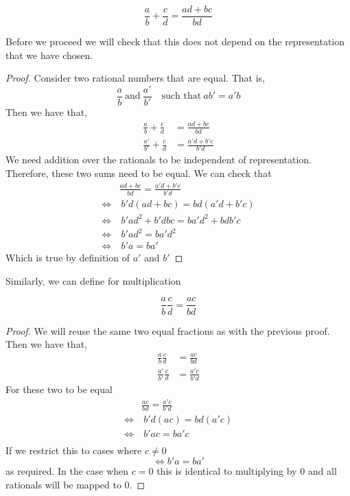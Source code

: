 \documentclass{article}
\begin{document}
\begin{defi}
    \[
        \frac{a}{b} + \frac{c}{d} = \frac{ad + bc}{bd}
    \]
\end{defi}

Before we proceed we will check that this does not depend on the representation that we have chosen.
\begin{proof}
    Consider two rational numbers that are equal. That is, 
    \[
        \frac{a}{b} \ \text{and} \ \frac{a'}{b'} \quad \text{such that} \ ab' = a'b
    \]
    Then we have that, 
    \begin{align*}
        \frac{a}{b} + \frac{c}{d} &= \frac{ad + bc}{bd} \\
        \frac{a'}{b'} + \frac{c}{d} &= \frac{a'd + b'c}{b'd}
    \end{align*}
    We need addition over the rationals to be independent of representation. Therefore, these two sums need to be equal. We can check that
    \begin{align*}
        &\frac{ad + bc}{bd} = \frac{a'd + b'c}{b'd} \\
        \Leftrightarrow& \ b'd(ad + bc) = bd(a'd + b'c) \\
        \Leftrightarrow& \ b'ad^2 + b'dbc = ba'd^2 + bdb'c \\
        \Leftrightarrow& \ b'ad^2 = ba'd^2 \\
        \Leftrightarrow& \ b'a = ba' \tag{since $d \neq 0$}
    \end{align*}
    Which is true by definition of $a'$ and $b'$
\end{proof}

Similarly, we can define for multiplication
\begin{defi}
    \[
        \frac{a}{b}\frac{c}{d} = \frac{ac}{bd}
    \]
\end{defi}
\begin{proof}
    We will reuse the same two equal fractions as with the previous proof. Then we have that, 
    \begin{align*}
        \frac{a}{b}\frac{c}{d} &= \frac{ac}{bd} \\
        \frac{a'}{b'}\frac{c}{d} &= \frac{a'c}{b'd}
    \end{align*}
    For these two to be equal
    \begin{align*}
        &\frac{ac}{bd} = \frac{a'c}{b'd} \\
        \Leftrightarrow& \ b'd(ac) = bd(a'c) \\
        \Leftrightarrow& \ b'ac = ba'c \tag{since $d \neq 0$} \\
    \end{align*}
    If we restrict this to cases where $c \neq 0$
    \[
        \Leftrightarrow b'a = ba'
    \]
    as required. In the case when $c = 0$ this is identical to multiplying by $0$ and all rationals will be mapped to $0$.
\end{proof}
\end{document}
